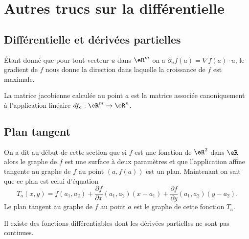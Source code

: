 \section{Autres trucs sur la différentielle}

\subsection{Différentielle et dérivées partielles}

Étant donné que pour tout vecteur \( u\) dans \( \eR^m\) on a \( \partial_uf(a)=\nabla f(a)\cdot u\), le gradient de \( f\) nous donne la direction dans laquelle la croissance de \( f\) est maximale. 

La matrice jacobienne calculée au point \( a\) est la matrice associée canoniquement à l'application linéaire \( df_a:\eR^m\to\eR^n\).

\subsection{Plan tangent}

On a dit au début de cette section que si \( f\) est une fonction de \( \eR^2\) dans \( \eR\) alors le graphe de \( f\) est une surface à deux paramètres et que l'application affine tangente au graphe de \( f\) au point \( (a, f(a))\) est un plan. Maintenant on sait que ce plan est celui d'équation
\begin{equation}
	T_a(x,y)=f(a_1,a_2)+\frac{ \partial f }{ \partial x }(a_1,a_2)(x-a_1)+\frac{ \partial f }{ \partial y }(a_1,a_2)(y-a_2).
\end{equation}
Le plan tangent au graphe de \( f\) au point \( a\) est le graphe de cette fonction \( T_a\).

\begin{proposition}     \label{PROPooJPRUooNOcXPJ}
	Il existe des fonctions différentiables dont les dérivées partielles ne sont pas continues.
\end{proposition}

